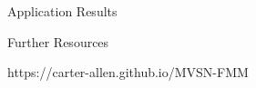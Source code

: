 \documentclass[final]{beamer}
\newlength{\onecolwid}
\begin{document}
\begin{frame}[t]
\begin{columns}[t]
\begin{column}{\onecolwid}
\begin{block}{Application Results}
\end{block}







\begin{alertblock}{Further Resources}

\centering
https://carter-allen.github.io/MVSN-FMM

\end{alertblock}


\end{column} %

\end{columns} %

\end{frame} %
\end{document}
